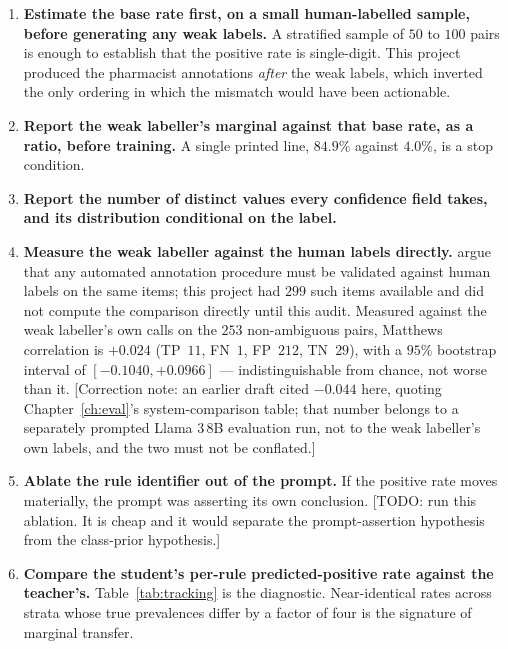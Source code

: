 \begin{enumerate}
\item \textbf{Estimate the base rate first, on a small human-labelled sample,
      before generating any weak labels.} A stratified sample of $50$ to $100$
      pairs is enough to establish that the positive rate is single-digit.
      This project produced the pharmacist annotations \emph{after} the weak
      labels, which inverted the only ordering in which the mismatch would have
      been actionable.
\item \textbf{Report the weak labeller's marginal against that base rate, as a
      ratio, before training.} A single printed line, $84.9\%$ against $4.0\%$,
      is a stop condition.
\item \textbf{Report the number of distinct values every confidence field takes,
      and its distribution conditional on the label.}
\item \textbf{Measure the weak labeller against the human labels directly.}
      \citet{pangakis2023validation} argue that any automated annotation
      procedure must be validated against human labels on the same items; this
      project had $299$ such items available and did not compute the
      comparison directly until this audit. Measured against the weak
      labeller's own calls on the $253$ non-ambiguous pairs, Matthews
      correlation is $+0.024$ (TP~$11$, FN~$1$, FP~$212$, TN~$29$), with a
      $95\%$ bootstrap interval of $[-0.1040, +0.0966]$ --- indistinguishable
      from chance, not worse than it. [Correction note: an
      earlier draft cited $-0.044$ here, quoting Chapter~\ref{ch:eval}'s
      system-comparison table; that number belongs to a separately prompted
      Llama 3\,8B evaluation run, not to the weak labeller's own labels, and
      the two must not be conflated.]
\item \textbf{Ablate the rule identifier out of the prompt.} If the positive
      rate moves materially, the prompt was asserting its own conclusion.
      [TODO: run this ablation. It is cheap and it would separate the
      prompt-assertion hypothesis from the class-prior hypothesis.]
\item \textbf{Compare the student's per-rule predicted-positive rate against the
      teacher's.} Table~\ref{tab:tracking} is the diagnostic. Near-identical
      rates across strata whose true prevalences differ by a factor of four is
      the signature of marginal transfer.
\end{enumerate}

